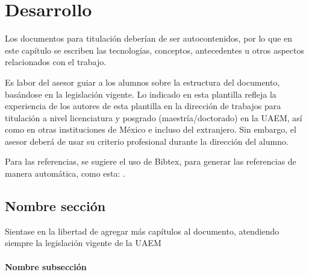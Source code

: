 \chapter{Desarrollo}

Los documentos para titulación deberían de ser autocontenidos, por lo que en este capítulo se escriben las tecnologías, conceptos, antecedentes u otros aspectos relacionados con el trabajo. 

Es labor del asesor guiar a los alumnos sobre la estructura del documento, basándose en la legislación vigente. Lo indicado en esta plantilla refleja la experiencia de los autores de esta plantilla en la dirección de trabajos para titulación a nivel licenciatura y posgrado (maestría/doctorado) en la UAEM, así como en otras instituciones de México e incluso del extranjero. Sin embargo, el asesor deberá de usar su criterio profesional durante la dirección del alumno.

Para las referencias, se sugiere el uso de Bibtex, para generar las referencias de manera automática, como esta: \cite{AguilarCastro2004}. 
\section{Nombre sección}
Sientase en la libertad de agregar más capítulos al documento, atendiendo siempre la legislación vigente de la UAEM
\subsubsection{Nombre subsección}



